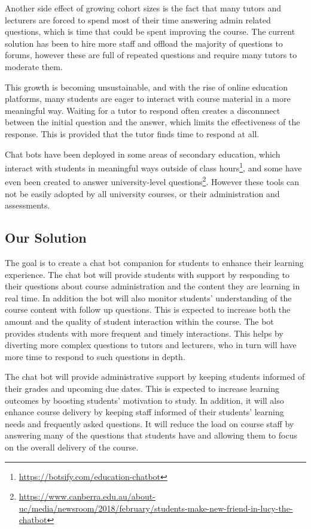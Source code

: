 \documentclass{article}
\begin{document}
Another side effect of growing cohort sizes is the fact that many tutors and lecturers are forced to spend most of their time answering admin related questions, which is time that could be spent improving the course. The current solution has been to hire more staff and offload the majority of questions to forums, however these are full of repeated questions and require many tutors to moderate them.

This growth is becoming unsustainable, and with the rise of online education platforms, many students are eager to interact with course material in a more meaningful way. Waiting for a tutor to respond often creates a disconnnect between the initial question and the answer, which limits the effectiveness of the response. This is provided that the tutor finds time to respond at all.

Chat bots have been deployed in some areas of secondary education, which interact with students in meaningful ways outside of class hours\footnote{\url{https://botsify.com/education-chatbot}}, and some have even been created to answer university-level questions\footnote{\url{https://www.canberra.edu.au/about-uc/media/newsroom/2018/february/students-make-new-friend-in-lucy-the-chatbot}}. However these tools can not be easily adopted by all university courses, or their administration and assessments.


\subsection{Our Solution}

The goal is to create a chat bot companion for students to enhance their learning experience. The chat bot will provide students with support by responding to their questions about course administration and the content they are learning in real time. In addition the bot will also monitor students' understanding of the course content with follow up questions. This is expected to increase both the amount and the quality of student interaction within the course. The bot provides students with more frequent and timely interactions. This helps by diverting more complex questions to tutors and lecturers, who in turn will have more time to respond to such questions in depth. 

The chat bot will provide administrative support by keeping students informed of their grades and upcoming due dates. This is expected to increase learning outcomes by boosting students' motivation to study. In addition, it will also enhance course delivery by keeping staff informed of their students' learning needs and frequently asked questions. It will reduce the load on course staff by answering many of the questions that students have and allowing them to focus on the overall delivery of the course. 
\end{document}
